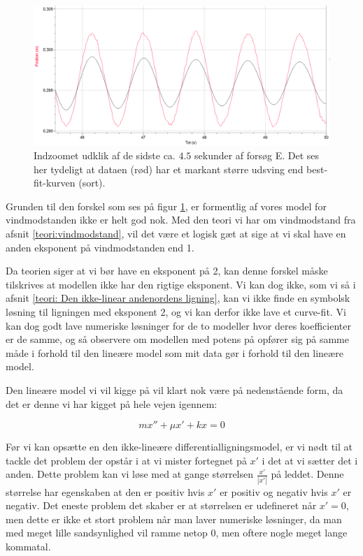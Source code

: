 \begin{figure}[h]
\center
\includegraphics[scale=0.5]{Figurer/Kurvefejl}
\caption{Indzoomet udklik af de sidste ca. $4.5$ sekunder af forsøg E. Det ses her tydeligt at dataen (rød) har et markant større udsving end best-fit-kurven (sort).}
\label{fig: Fejlkurve exp2}
\end{figure}

Grunden til den forskel som ses på figur \ref{fig: Fejlkurve exp2}, er formentlig af vores model for vindmodstanden ikke er helt god nok. 
Med den teori vi har om vindmodstand fra afsnit \ref{teori:vindmodstand}, vil det være et logisk gæt at sige at vi skal have en anden eksponent på vindmodstanden end 1. 

Da teorien siger at vi bør have en eksponent på 2, kan denne forskel måske tilskrives at modellen ikke har den rigtige eksponent.
Vi kan dog ikke, som vi så i afsnit \ref{teori: Den ikke-linear andenordens ligning}, kan vi ikke finde en symbolsk løsning til ligningen med eksponent 2, og vi kan derfor ikke lave et curve-fit. 
Vi kan dog godt lave numeriske løsninger for de to modeller hvor deres koefficienter er de samme, og så observere om modellen med potens på opfører sig på samme måde i forhold til den lineære model som mit data gør i forhold til den lineære model.

Den lineære model vi vil kigge på vil klart nok være på nedenstående form, da det er denne vi har kigget på hele vejen igennem:

\begin{equation}
mx'' + \mu x' + kx = 0
\label{eq: standard linear diff}
\end{equation}
 

Før vi kan opsætte en den ikke-lineære differentialligningsmodel, er vi nødt til at tackle det problem der opstår i at vi mister fortegnet på $x'$ i det at vi sætter det i anden.
Dette problem kan vi løse med at gange størrelsen $\frac{x'}{|x'|}$ på leddet. 
Denne størrelse har egenskaben at den er positiv hvis $x'$ er positiv og negativ hvis $x'$ er negativ. 
Det eneste problem det skaber er at størrelsen er udefineret når $x'=0$, men dette er ikke et stort problem når man laver numeriske løsninger, da man med meget lille sandsynlighed vil ramme netop 0, men oftere nogle meget lange kommatal. 

